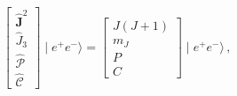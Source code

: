 \begin{equation}
\left[ 
\begin{array}{c}
\widehat{\mathbf{J}}^{2} \\ 
\widehat{J}_{3} \\ 
\widehat{\mathcal{P}} \\ 
\widehat{\mathcal{C}}
\end{array}
\right] \mid e^{+}e^{-}\rangle =\left[ 
\begin{array}{c}
J\left( J+1\right) \\ 
m_{J} \\ 
P \\ 
C
\end{array}
\right] \mid e^{+}e^{-}\rangle \, ,
\end{equation}

